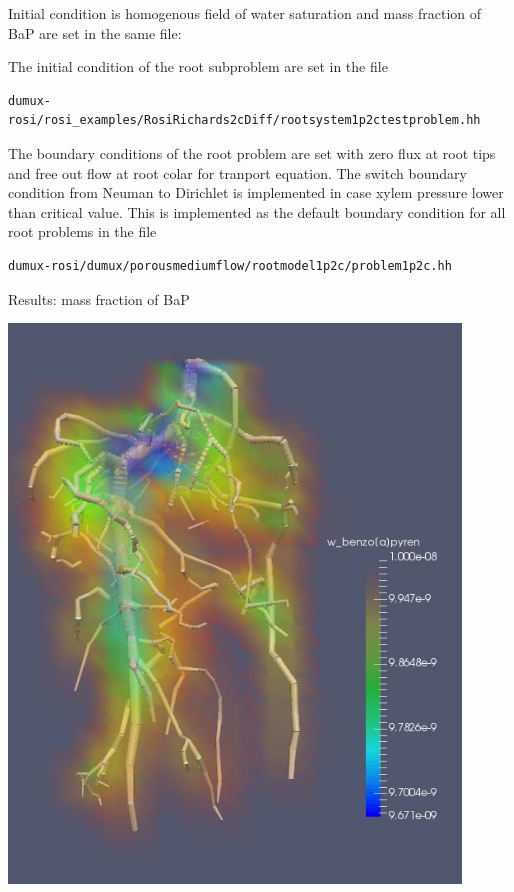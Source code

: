 Initial condition is homogenous field of water saturation and mass fraction of BaP are set in the same file:


The initial condition of the root subproblem are set in the file 
\begin{lstlisting}
dumux-rosi/rosi_examples/RosiRichards2cDiff/rootsystem1p2ctestproblem.hh
\end{lstlisting}



The boundary conditions of the root problem are set with zero flux at root tips and free out flow at root colar for tranport equation. The switch boundary condition from Neuman to Dirichlet is implemented in case xylem pressure lower than critical value. This is implemented as the default boundary condition for all root problems in the file 
\begin{lstlisting}
dumux-rosi/dumux/porousmediumflow/rootmodel1p2c/problem1p2c.hh
\end{lstlisting}



Results: mass fraction of BaP

\noindent\begin{minipage}[c]{1\columnwidth}%
\includegraphics[width=0.9\textwidth]{example_pesticides}%
\end{minipage}

